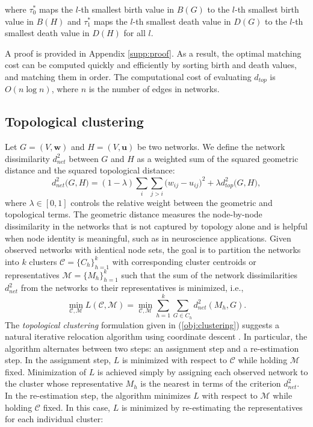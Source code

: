 \documentclass{article} %
\begin{document}
where $\tau_0^*$ maps the $l$-th smallest birth value in $B(G)$ to the $l$-th smallest birth value in $B(H)$ and $\tau_1^*$ maps the $l$-th smallest death value in $D(G)$ to the $l$-th smallest death value in $D(H)$ for all $l$.

A proof is provided in Appendix \ref{supp:proof}. As a result, the optimal matching cost can be computed quickly and efficiently by sorting birth and death values, and matching them in order. The computational cost of evaluating $d_{top}$ is $O(n \log n)$, where $n$ is the number of edges in networks.


\subsection{Topological clustering}

Let $G=(V,\bm{w})$ and $H=(V,\bm{u})$ be two networks. We define the network dissimilarity $d^2_{net}$ between $G$ and $H$ as a weighted sum of the squared geometric distance and the squared topological distance:
\begin{equation}
\label{eq:dnet}
d^2_{net}\big(G,H\big) = (1-\lambda) \sum_{i}\sum_{j>i} \big(w_{ij} - u_{ij} \big)^2 + \lambda d^2_{top}\big(G,H \big),
\end{equation}
where $\lambda \in [0,1]$ controls the relative weight between the geometric and topological terms. The geometric distance measures the node-by-node dissimilarity in the networks that is not captured by topology alone and is helpful when node identity is meaningful, such as in neuroscience applications.
Given observed networks with identical node sets, the goal is to partition the networks into $k$ clusters
$\mathcal{C} = \{C_h\}_{h=1}^k$ with corresponding cluster centroids or representatives $\mathcal{M} = \{M_h\}_{h=1}^k$ such that the sum of the network dissimilarities $d^2_{net}$ from the networks to their representatives is minimized, i.e.,
\begin{equation}
\min_{\mathcal{C},\mathcal{M}} L(\mathcal{C},\mathcal{M}) = \min_{\mathcal{C},\mathcal{M}} \sum_{h=1}^k \sum_{G \in C_h} d^2_{net}(M_h,G) .
\label{obj:clustering}
\end{equation} 
The {\em topological clustering} formulation given in (\ref{obj:clustering}) suggests a natural iterative relocation algorithm using coordinate descent \citep{banerjee2005clustering}.
In particular, the algorithm alternates between two steps: an assignment step and a re-estimation step. In the assignment step, $L$ is minimized with respect to $\mathcal{C}$ while holding $\mathcal{M}$ fixed. Minimization of $L$ is achieved simply by assigning each observed network to the cluster whose representative $M_h$ is the nearest in terms of the criterion $d^2_{net}$. In the re-estimation step, the algorithm minimizes $L$ with respect to $\mathcal{M}$ while holding $\mathcal{C}$ fixed. In this case, $L$ is minimized by re-estimating the representatives for each individual cluster:
\end{document}
